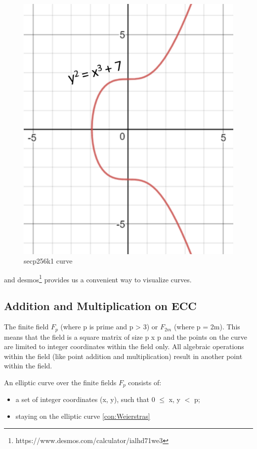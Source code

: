 \documentclass[a4paper,11pt]{article}
\begin{document}
\begin{figure}[H]
\centering
\includegraphics[scale=0.5]{./images/bitcoin-elliptic-curve.png}
\caption{secp256k1 curve}
\end{figure}
and desmos\footnote{https://www.desmos.com/calculator/ialhd71we3}  provides us a convenient way to visualize curves.

\subsection{Addition and Multiplication on ECC}
The finite field $F_p$  (where p is prime and p > 3) or $F_{2m}$ (where p = 2m). This means that the field is a square matrix of size p x p and the points on the curve are limited to integer coordinates within the field only. All algebraic operations within the field (like point addition and multiplication) result in another point within the field. 

An elliptic curve over the finite fields $F_p$ consists of:
\begin{itemize}
\item a set of integer coordinates (x, y), such that 0 $\leq$ x, y $<$ p;
\item staying on the elliptic curve  \ref{con:Weierstras}
\end{itemize}
\end{document}
